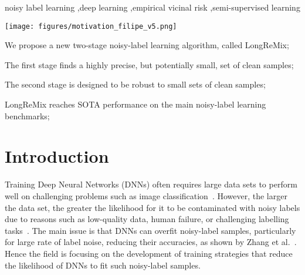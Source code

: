\documentclass[review]{elsarticle}
\begin{document}
\begin{frontmatter}
\begin{abstract}
\end{abstract}

\begin{keyword}
noisy label learning \sep deep learning \sep empirical vicinal risk \sep semi-supervised learning
\end{keyword}

\begin{graphicalabstract}
\texttt{[image: figures/motivation\_filipe\_v5.png]}
\end{graphicalabstract}


\begin{highlights}
\item We propose a new two-stage noisy-label learning algorithm, called LongReMix;
 
\item The first stage finds a highly precise, but potentially small, set of clean samples;

\item The second stage is designed to be robust to small sets of clean samples;

\item LongReMix reaches SOTA performance on the main noisy-label learning benchmarks;

\end{highlights}

\end{frontmatter}



\section{Introduction}\label{sec:introduction}

Training Deep Neural Networks (DNNs) often requires large data sets to perform well on challenging problems such as image classification~\cite{litjens2017survey}. However, the larger the data set, the greater the likelihood for it to be contaminated with noisy labels due to reasons such as low-quality data, human failure, or challenging labelling tasks~\cite{frenay_survey}. 
The main issue is that DNNs can overfit noisy-label samples, particularly for large rate of label noise, reducing their accuracies, as shown by Zhang et al.~\cite{zhang2016understanding}. Hence the field is focusing on the development of training strategies that reduce the likelihood of DNNs to fit such noisy-label samples.
\end{document}
